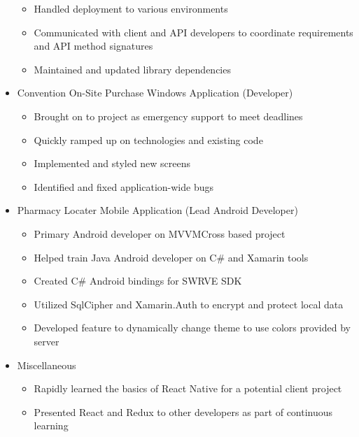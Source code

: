 \documentclass[12pt,letterpaper,sans]{moderncv}
\begin{document}
\begin{itemize}[leftmargin=1.24in]
\begin{itemize}
	    		\item Handled deployment to various environments
	    		\item Communicated with client and API developers to coordinate requirements and API method signatures
	    		\item Maintained and updated library dependencies 
	    	\end{itemize} 
    	\item Convention On-Site Purchase Windows Application (Developer)
		    \begin{itemize}
			    \item Brought on to project as emergency support to meet deadlines
			    \item Quickly ramped up on technologies and existing code
			    \item Implemented and styled new screens
			    \item Identified and fixed application-wide bugs
			\end{itemize} 
    	\item Pharmacy Locater Mobile Application (Lead Android Developer)
	    	\begin{itemize}
		    	\item Primary Android developer on MVVMCross based project
		    	\item Helped train Java Android developer on C\# and Xamarin tools
		    	\item Created C\# Android bindings for SWRVE SDK
		    	\item Utilized SqlCipher and Xamarin.Auth to encrypt and protect local data
		    	\item Developed feature to dynamically change theme to use colors provided by server
		    \end{itemize} 
	   	\item Miscellaneous
	   		\begin{itemize}
	   			\item Rapidly learned the basics of React Native for a potential client project
	   			\item Presented React and Redux to other developers as part of continuous learning
	   		\end{itemize}
    \end{itemize} 
\end{document}
